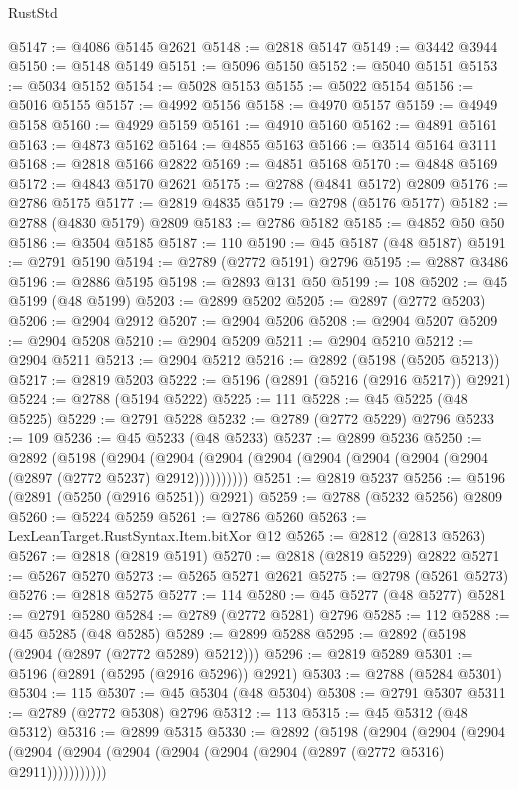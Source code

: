 \begin{lexlean}{RustStd}
\begin{coremodule}
@5147 := @4086 @5145 @2621
@5148 := @2818 @5147
@5149 := @3442 @3944
@5150 := @5148 @5149
@5151 := @5096 @5150
@5152 := @5040 @5151
@5153 := @5034 @5152
@5154 := @5028 @5153
@5155 := @5022 @5154
@5156 := @5016 @5155
@5157 := @4992 @5156
@5158 := @4970 @5157
@5159 := @4949 @5158
@5160 := @4929 @5159
@5161 := @4910 @5160
@5162 := @4891 @5161
@5163 := @4873 @5162
@5164 := @4855 @5163
@5166 := @3514 @5164 @3111
@5168 := @2818 @5166 @2822
@5169 := @4851 @5168
@5170 := @4848 @5169
@5172 := @4843 @5170 @2621
@5175 := @2788 (@4841 @5172) @2809
@5176 := @2786 @5175
@5177 := @2819 @4835
@5179 := @2798 (@5176 @5177)
@5182 := @2788 (@4830 @5179) @2809
@5183 := @2786 @5182
@5185 := @4852 @50 @50
@5186 := @3504 @5185
@5187 := 110
@5190 := @45 @5187 (@48 @5187)
@5191 := @2791 @5190
@5194 := @2789 (@2772 @5191) @2796
@5195 := @2887 @3486
@5196 := @2886 @5195
@5198 := @2893 @131 @50
@5199 := 108
@5202 := @45 @5199 (@48 @5199)
@5203 := @2899 @5202
@5205 := @2897 (@2772 @5203)
@5206 := @2904 @2912
@5207 := @2904 @5206
@5208 := @2904 @5207
@5209 := @2904 @5208
@5210 := @2904 @5209
@5211 := @2904 @5210
@5212 := @2904 @5211
@5213 := @2904 @5212
@5216 := @2892 (@5198 (@5205 @5213))
@5217 := @2819 @5203
@5222 := @5196 (@2891 (@5216 (@2916 @5217)) @2921)
@5224 := @2788 (@5194 @5222)
@5225 := 111
@5228 := @45 @5225 (@48 @5225)
@5229 := @2791 @5228
@5232 := @2789 (@2772 @5229) @2796
@5233 := 109
@5236 := @45 @5233 (@48 @5233)
@5237 := @2899 @5236
@5250 := @2892
    (@5198
      (@2904 (@2904 (@2904 (@2904 (@2904 (@2904 (@2904 (@2904 (@2897 (@2772 @5237) @2912))))))))))
@5251 := @2819 @5237
@5256 := @5196 (@2891 (@5250 (@2916 @5251)) @2921)
@5259 := @2788 (@5232 @5256) @2809
@5260 := @5224 @5259
@5261 := @2786 @5260
@5263 := LexLeanTarget.RustSyntax.Item.bitXor @12
@5265 := @2812 (@2813 @5263)
@5267 := @2818 (@2819 @5191)
@5270 := @2818 (@2819 @5229) @2822
@5271 := @5267 @5270
@5273 := @5265 @5271 @2621
@5275 := @2798 (@5261 @5273)
@5276 := @2818 @5275
@5277 := 114
@5280 := @45 @5277 (@48 @5277)
@5281 := @2791 @5280
@5284 := @2789 (@2772 @5281) @2796
@5285 := 112
@5288 := @45 @5285 (@48 @5285)
@5289 := @2899 @5288
@5295 := @2892 (@5198 (@2904 (@2897 (@2772 @5289) @5212)))
@5296 := @2819 @5289
@5301 := @5196 (@2891 (@5295 (@2916 @5296)) @2921)
@5303 := @2788 (@5284 @5301)
@5304 := 115
@5307 := @45 @5304 (@48 @5304)
@5308 := @2791 @5307
@5311 := @2789 (@2772 @5308) @2796
@5312 := 113
@5315 := @45 @5312 (@48 @5312)
@5316 := @2899 @5315
@5330 := @2892
    (@5198
      (@2904
        (@2904
          (@2904 (@2904 (@2904 (@2904 (@2904 (@2904 (@2904 (@2897 (@2772 @5316) @2911)))))))))))

\end{coremodule}
\end{lexlean}
